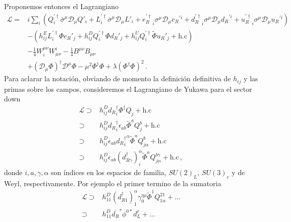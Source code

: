 \begin{frame}
Proponemos entonces el Lagrangiano
\begin{align}
\label{eq:265qft} 
    \mathcal{L}=&i\sum_i\left( Q^{\prime\dagger}_i\overline{\sigma}^\mu\mathcal{D}_\mu Q'_i+ L^{\prime\dagger}_i\overline{\sigma}^\mu\mathcal{D}_\mu L'_i+
{e_R^{\prime\dagger}}_i\sigma^\mu\mathcal{D}_\mu {e_R}^{\prime i}+{d_R^{\prime\dagger}}_i\sigma^\mu\mathcal{D}_\mu {d_R}^{\prime i}+{u_R^{\prime\dagger}}_i\sigma^\mu\mathcal{D}_\mu {u_R}^{\prime i}\right)
\nonumber\\
     &-(h_{ij}^E L^{\prime\dagger}_i\Phi {e_R}'_j+h_{ij}^D Q^{\prime\dagger}_i\Phi {d_R}'_j+h_{ij}^U Q^{\prime\dagger}_i\widetilde{\Phi}{u_R}'_j+\text{h.c})\nonumber\\
     &-\tfrac{1}{4}W^{\mu\nu}_i W_{\mu\nu}^i-\tfrac{1}{4}B^{\mu\nu} B_{\mu\nu}\nonumber\\
     &+(\mathcal{D}_\mu\Phi)^\dagger\mathcal{D}^\mu\Phi-\mu^2\Phi^\dagger\Phi+\lambda(\Phi^\dagger\Phi)^2\,.
\end{align}
Para aclarar la notación, obviando de momento la definición definitiva de $h_{ij}$ y las primas sobre los campos, consideremos el Lagrangiano de Yukawa para el sector down
\begin{align}
  \label{eq:264qft}
  \mathcal{L}\supset&h^D_{ij}{d_R}^{\dagger}_i\Phi^\dagger Q_j+\text{h.c}\nonumber\\
\supset&h^D_{ij}{d_R}^{\dagger}_i\epsilon_{ab}\widetilde{\Phi}^aQ_j^b+\text{h.c}\nonumber\\
\supset&h^D_{ij}\epsilon_{ab}{{d_R}^{\dagger}_i}^\alpha\widetilde{\Phi}^aQ_{j\alpha}^b+\text{h.c}\nonumber\\
\supset&h^D_{ij}\epsilon_{ab}{(d_{R\gamma}^\dagger)}_i^\alpha\widetilde{\Phi}^aQ_{j\alpha}^{b\gamma}+\text{h.c}\,,
\end{align}
donde $i,a,\gamma,\alpha$ son índices en los espacios de familia, $SU(2)_L$, $SU(3)_c$ y de Weyl, respectivamente. Por ejemplo el primer termino de la sumatoria 
\begin{align}
\mathcal{L}\supset&h^D_{11}{(d_{R1}^\dagger)}_1^{\alpha}\gamma_0^{\eta\rho}\widetilde{\Phi}^1Q_{1\alpha}^{21}+\ldots\nonumber\\
\supset&h^D_{11}\overline{d_R}^r\phi^{0*}d_{L}^r+\ldots\,
\end{align}


\end{frame}
